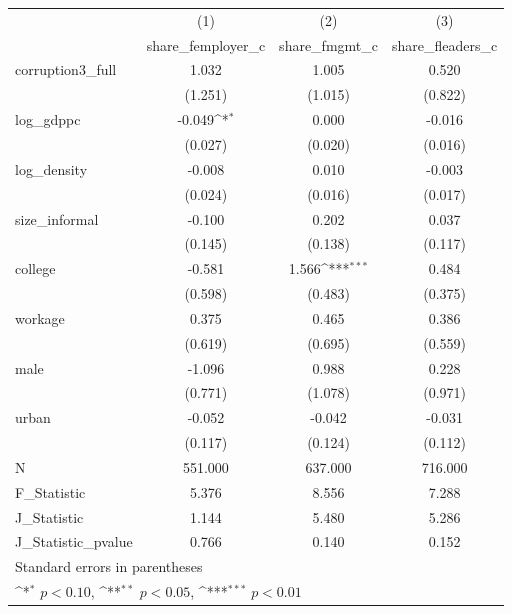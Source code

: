 {
\def\sym#1{\ifmmode^{#1}\else\(^{#1}\)\fi}
\begin{tabular}{l*{3}{c}}
\hline\hline
            &\multicolumn{1}{c}{(1)}&\multicolumn{1}{c}{(2)}&\multicolumn{1}{c}{(3)}\\
            &\multicolumn{1}{c}{share\_femployer\_c}&\multicolumn{1}{c}{share\_fmgmt\_c}&\multicolumn{1}{c}{share\_fleaders\_c}\\
\hline
corruption3\_full&       1.032         &       1.005         &       0.520         \\
            &     (1.251)         &     (1.015)         &     (0.822)         \\
[1em]
log\_gdppc   &      -0.049\sym{*}  &       0.000         &      -0.016         \\
            &     (0.027)         &     (0.020)         &     (0.016)         \\
[1em]
log\_density &      -0.008         &       0.010         &      -0.003         \\
            &     (0.024)         &     (0.016)         &     (0.017)         \\
[1em]
size\_informal&      -0.100         &       0.202         &       0.037         \\
            &     (0.145)         &     (0.138)         &     (0.117)         \\
[1em]
college     &      -0.581         &       1.566\sym{***}&       0.484         \\
            &     (0.598)         &     (0.483)         &     (0.375)         \\
[1em]
workage     &       0.375         &       0.465         &       0.386         \\
            &     (0.619)         &     (0.695)         &     (0.559)         \\
[1em]
male        &      -1.096         &       0.988         &       0.228         \\
            &     (0.771)         &     (1.078)         &     (0.971)         \\
[1em]
urban       &      -0.052         &      -0.042         &      -0.031         \\
            &     (0.117)         &     (0.124)         &     (0.112)         \\
\hline
N           &     551.000         &     637.000         &     716.000         \\
F\_Statistic &       5.376         &       8.556         &       7.288         \\
J\_Statistic &       1.144         &       5.480         &       5.286         \\
J\_Statistic\_pvalue&       0.766         &       0.140         &       0.152         \\
\hline\hline
\multicolumn{4}{l}{\footnotesize Standard errors in parentheses}\\
\multicolumn{4}{l}{\footnotesize \sym{*} \(p<0.10\), \sym{**} \(p<0.05\), \sym{***} \(p<0.01\)}\\
\end{tabular}
}
